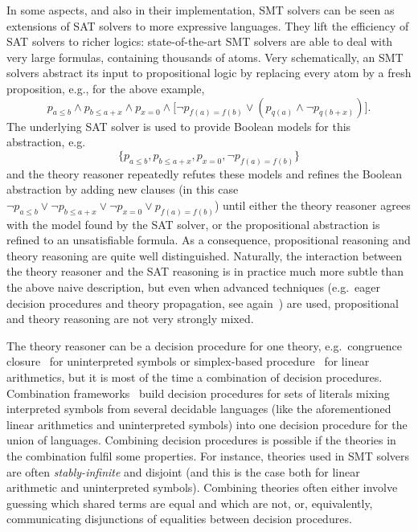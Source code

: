 \documentclass{llncs}
\begin{document}
In some aspects, and also in their implementation, SMT solvers can be seen as
extensions of SAT solvers to more expressive languages.  They lift the
efficiency of SAT solvers to richer logics: state-of-the-art SMT solvers are
able to deal with very large formulas, containing thousands of atoms.  Very
schematically, an SMT solvers abstract its input to propositional logic by replacing every atom by a fresh proposition, e.g., for the above example,
\begin{displaymath}
p_{a \leq b} \wedge p_{b \leq a + x} \wedge p_{x = 0} \wedge
 \big[ \neg p_{f(a) = f(b)} \vee (p_{q(a)} \wedge \neg p_{q(b + x)}) \big].
\end{displaymath}
The underlying SAT solver is used to provide Boolean models for this
abstraction, e.g.\
\begin{displaymath}
\{ p_{a \leq b}, p_{b \leq a + x}, p_{x = 0}, \neg p_{f(a) = f(b)} \}
\end{displaymath}
and the theory reasoner repeatedly refutes these models and refines the Boolean
abstraction by adding new clauses (in this case $\neg p_{a \leq b} \vee \neg p_{b
  \leq a + x} \vee \neg p_{x = 0} \vee p_{f(a) = f(b)}$) until either the theory
reasoner agrees with the model found by the SAT solver, or the propositional
abstraction is refined to an unsatisfiable formula.  As a consequence,
propositional reasoning and theory reasoning are quite well distinguished.
Naturally, the interaction between the theory reasoner and the SAT reasoning is
in practice much more subtle than the above naive description, but even when
advanced techniques (e.g.\ eager decision procedures\marginpar{Clark, correct me
  on eager\dots} and theory propagation, see again~\cite{}) are used,
propositional and theory reasoning are not very strongly mixed.

The theory reasoner can be a decision procedure for one theory, e.g.\ congruence
closure~\cite{} for uninterpreted symbols or simplex-based procedure~\cite{} for
linear arithmetics, but it is most of the time a combination of decision
procedures.  Combination frameworks~\cite{} build decision procedures for sets
of literals mixing interpreted symbols from several decidable languages (like
the aforementioned linear arithmetics and uninterpreted symbols) into one
decision procedure for the union of languages.  Combining decision procedures is
possible if the theories in the combination fulfil some properties.  For
instance, theories used in SMT solvers are often \emph{stably-infinite} and
disjoint (and this is the case both for linear arithmetic and uninterpreted
symbols).  Combining theories often either involve guessing which shared terms
are equal and which are not, or, equivalently, communicating disjunctions of equalities between decision procedures.
\end{document}

